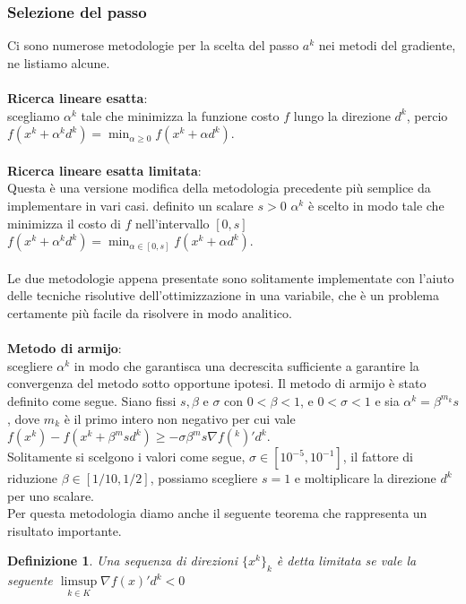 \documentclass[a4paper, 12pt]{article}
\newtheorem{definition}{Definizione}
\begin{document}
\subsubsection{Selezione del passo}
Ci sono numerose metodologie per la scelta del passo $a^k$ nei metodi del gradiente, ne listiamo alcune.\\\\
\textbf{Ricerca lineare esatta}:\\
scegliamo $\alpha^k$ tale che minimizza la funzione costo $f$ lungo la direzione $d^k$, percio\\
$f(x^k + \alpha^k d^k) = \min_{\alpha \geq 0} f(x^k + \alpha d^k)$.\\\\
\textbf{Ricerca lineare esatta limitata}:\\
Questa è una versione modifica della metodologia precedente più semplice da implementare in vari casi. definito un scalare $s > 0$ $\alpha^k$ è scelto in modo tale che minimizza il costo di $f$ nell'intervallo $[0, s]$\\
$f(x^k + \alpha^k d^k) = \min_{\alpha \in [0, s]} f(x^k + \alpha d^k)$.\\\\
Le due metodologie appena presentate sono solitamente implementate con l'aiuto delle tecniche risolutive dell'ottimizzazione in una variabile, che è un problema certamente più facile da risolvere in modo analitico.\\\\
\textbf{Metodo di armijo}:\\
scegliere $\alpha^k$ in modo che garantisca una decrescita sufficiente a garantire la convergenza del metodo sotto opportune ipotesi. Il metodo di armijo è stato definito come segue. Siano fissi $s, \beta$ e $\sigma$ con $0 < \beta < 1$, e $0 < \sigma < 1$ e sia $\alpha^k = \beta^{m_k} s$, dove $m_k$ è il primo intero non negativo per cui vale\\
$f(x^k) - f(x^k + \beta^m s d^k) \geq -\sigma \beta^m s \nabla f(^k)'d^k$.\\
Solitamente si scelgono i valori come segue, $\sigma \in [10^{-5}, 10^{-1}]$, il fattore di riduzione $\beta \in [1/10, 1/2]$, possiamo scegliere $s = 1$ e moltiplicare la direzione $d^k$ per uno scalare.\\
Per questa metodologia diamo anche il seguente teorema che rappresenta un risultato importante.
\begin{definition}
Una sequenza di direzioni $\{x^k\}_k$ è detta limitata se vale la seguente $\limsup\limits_{k \in K} \nabla f(x)'d^k < 0$
\end{definition}
\end{document}
